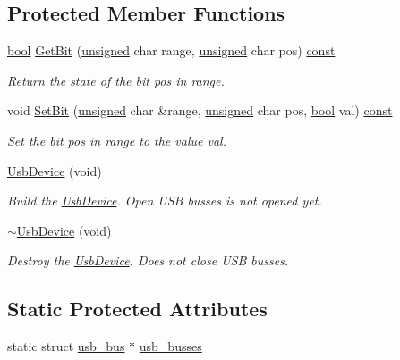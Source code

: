 \subsection*{Protected Member Functions}
\begin{DoxyCompactItemize}
\item 
\hyperlink{term__entry_8h_a002004ba5d663f149f6c38064926abac}{bool} \hyperlink{classhbs_1_1_usb_device_a6d1ea9dbbef53b28fde7436cffd8b071}{Get\-Bit} (\hyperlink{curses_8priv_8h_aca40206900cfc164654362fa8d4ad1e6}{unsigned} char range, \hyperlink{curses_8priv_8h_aca40206900cfc164654362fa8d4ad1e6}{unsigned} char pos) \hyperlink{term__entry_8h_a57bd63ce7f9a353488880e3de6692d5a}{const} 
\begin{DoxyCompactList}\small\item\em Return the state of the bit pos in range. \end{DoxyCompactList}\item 
void \hyperlink{classhbs_1_1_usb_device_a471373331014d2b0b4b5b1b8d07bfaae}{Set\-Bit} (\hyperlink{curses_8priv_8h_aca40206900cfc164654362fa8d4ad1e6}{unsigned} char \&range, \hyperlink{curses_8priv_8h_aca40206900cfc164654362fa8d4ad1e6}{unsigned} char pos, \hyperlink{term__entry_8h_a002004ba5d663f149f6c38064926abac}{bool} val) \hyperlink{term__entry_8h_a57bd63ce7f9a353488880e3de6692d5a}{const} 
\begin{DoxyCompactList}\small\item\em Set the bit pos in range to the value val. \end{DoxyCompactList}\item 
\hyperlink{classhbs_1_1_usb_device_a0ad7f6d5f5c91efc39193843ee8179b2}{Usb\-Device} (void)
\begin{DoxyCompactList}\small\item\em Build the \hyperlink{classhbs_1_1_usb_device}{Usb\-Device}. Open U\-S\-B busses is not opened yet. \end{DoxyCompactList}\item 
\hyperlink{classhbs_1_1_usb_device_a31b62a67b5169838cb7ff4ca71334758}{$\sim$\-Usb\-Device} (void)
\begin{DoxyCompactList}\small\item\em Destroy the \hyperlink{classhbs_1_1_usb_device}{Usb\-Device}. Does not close U\-S\-B busses. \end{DoxyCompactList}\end{DoxyCompactItemize}
\subsection*{Static Protected Attributes}
\begin{DoxyCompactItemize}
\item 
static struct \hyperlink{structusb__bus}{usb\-\_\-bus} $\ast$ \hyperlink{classhbs_1_1_usb_device_a413e973b7845d496de4b5d30fc4f38a9}{usb\-\_\-busses}
\end{DoxyCompactItemize}



